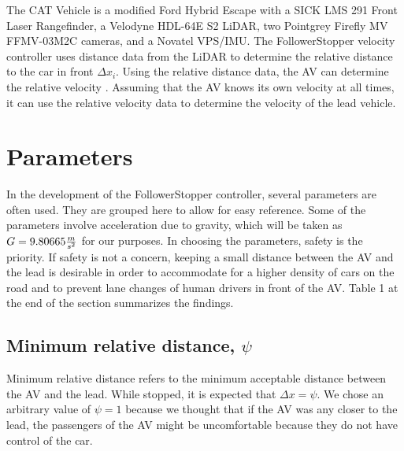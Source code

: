 \documentclass[conference]{IEEEtran}
\begin{document}
\hspace{0.01 in}The CAT Vehicle is a modified Ford Hybrid Escape with a SICK LMS 291 Front Laser Rangefinder, a Velodyne HDL-64E S2 LiDAR, two Pointgrey Firefly MV FFMV-03M2C cameras, and a Novatel VPS/IMU. The FollowerStopper velocity controller uses distance data from the LiDAR to determine the relative distance to the car in front $\Delta x_i$. Using the relative distance data, the AV can determine the relative velocity \cite{bhadani2019real}. Assuming that the AV knows its own velocity at all times, it can use the relative velocity data to determine the velocity of the lead vehicle.






\section{Parameters}
In the development of the FollowerStopper controller, several parameters are often used. They are grouped here to allow for easy reference. Some of the parameters involve acceleration due to gravity, which will be taken as $G=9.80665 {m\over s^2}$ for our purposes. In choosing the parameters, safety is the priority. If safety is not a concern, keeping a small distance between the AV and the lead is desirable in order to accommodate for a higher density of cars on the road and to prevent lane changes of human drivers in front of the AV. Table 1 at the end of the section summarizes the findings.
 
\subsection{Minimum relative distance, $\psi$}
Minimum relative distance refers to the minimum acceptable distance between the AV and the lead. While stopped, it is expected that $\Delta x= \psi$. We chose an arbitrary value of $\psi=1$ because we thought that if the AV was any closer to the lead, the passengers of the AV might be uncomfortable because they do not have control of the car. 
\end{document}
